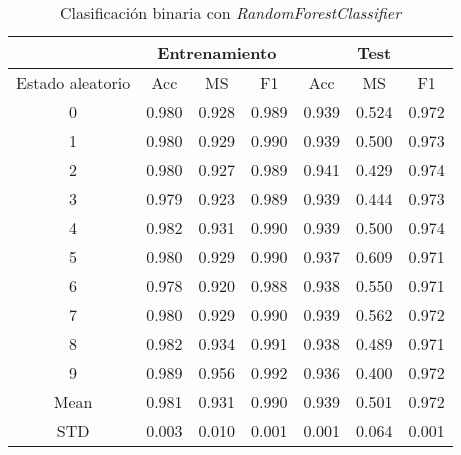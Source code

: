 \begin{table}[th]
	\centering
	\begin{tabular}{ |c|c|c|c|c|c|c| }
		\hline
		\rowcolor{LightCyan}
		 & \multicolumn{3}{c|}{Entrenamiento} & \multicolumn{3}{c|}{Test} \\
		\hline
		\rowcolor{LightCyan}
		 Estado aleatorio & Acc & MS & F1 & Acc & MS & F1 \\
		\hline
		0 & 0.980 & 0.928 & 0.989 & 0.939 & 0.524 & 0.972 \\
		1 & 0.980 & 0.929 & 0.990 & 0.939 & 0.500 & 0.973 \\
		2 & 0.980 & 0.927 & 0.989 & 0.941 & 0.429 & 0.974 \\
		3 & 0.979 & 0.923 & 0.989 & 0.939 & 0.444 & 0.973 \\
		4 & 0.982 & 0.931 & 0.990 & 0.939 & 0.500 & 0.974 \\
		5 & 0.980 & 0.929 & 0.990 & 0.937 & 0.609 & 0.971 \\
		6 & 0.978 & 0.920 & 0.988 & 0.938 & 0.550 & 0.971 \\
		7 & 0.980 & 0.929 & 0.990 & 0.939 & 0.562 & 0.972 \\
		8 & 0.982 & 0.934 & 0.991 & 0.938 & 0.489 & 0.971 \\
		9 & 0.989 & 0.956 & 0.992 & 0.936 & 0.400 & 0.972 \\
		Mean & 0.981 & 0.931 & 0.990 & 0.939 & 0.501 & 0.972 \\
		STD & 0.003 & 0.010 & 0.001 & 0.001 & 0.064 & 0.001 \\
		\hline
	\end{tabular}
	\caption{Clasificación binaria con \textit{RandomForestClassifier}}
	\label{tabla:rf_bin}
\end{table}
